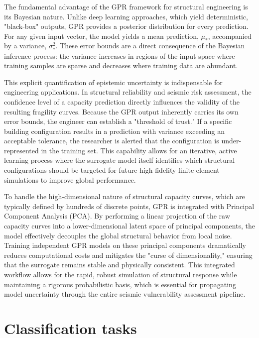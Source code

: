 \begin{refsection}
The fundamental advantage of the GPR framework for structural engineering is its Bayesian nature. Unlike deep learning approaches, which yield deterministic, "black-box" outputs, GPR provides a posterior distribution for every prediction. For any given input vector, the model yields a mean prediction, $\mu_*$, accompanied by a variance, $\sigma^2_*$. These error bounds are a direct consequence of the Bayesian inference process: the variance increases in regions of the input space where training samples are sparse and decreases where training data are abundant.

This explicit quantification of epistemic uncertainty is indispensable for engineering applications. In structural reliability and seismic risk assessment, the confidence level of a capacity prediction directly influences the validity of the resulting fragility curves. Because the GPR output inherently carries its own error bounds, the engineer can establish a "threshold of trust." If a specific building configuration results in a prediction with variance exceeding an acceptable tolerance, the researcher is alerted that the configuration is under-represented in the training set. This capability allows for an iterative, active learning process where the surrogate model itself identifies which structural configurations should be targeted for future high-fidelity finite element simulations to improve global performance.

To handle the high-dimensional nature of structural capacity curves, which are typically defined by hundreds of discrete points, GPR is integrated with Principal Component Analysis (PCA). By performing a linear projection of the raw capacity curves into a lower-dimensional latent space of principal components, the model effectively decouples the global structural behavior from local noise. Training independent GPR models on these principal components dramatically reduces computational costs and mitigates the "curse of dimensionality," ensuring that the surrogate remains stable and physically consistent. This integrated workflow allows for the rapid, robust simulation of structural response while maintaining a rigorous probabilistic basis, which is essential for propagating model uncertainty through the entire seismic vulnerability assessment pipeline.

\section{Classification tasks}


\end{refsection}
